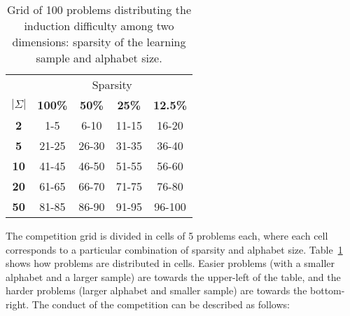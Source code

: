\begin{table}
\begin{center}
\begin{tabular}{c|c c c c}
&\multicolumn{4}{|c}{Sparsity}\\ 
\textbf{$|\Sigma|$} & \textbf{100\%} & \textbf{50\%} & \textbf{25\%} & \textbf{12.5\%}\\
\hline
\textbf{2}  & 1-5   & 6-10  & 11-15 & 16-20 \\
\textbf{5}  & 21-25 & 26-30 & 31-35 & 36-40 \\
\textbf{10} & 41-45 & 46-50 & 51-55 & 56-60 \\
\textbf{20} & 61-65 & 66-70 & 71-75 & 76-80 \\
\textbf{50} & 81-85 & 86-90 & 91-95 & 96-100\\
\end{tabular}
\end{center}
\caption{\label{stamina:table:problem-grid}Grid of 100 problems distributing the induction difficulty among two dimensions: sparsity of the learning sample and alphabet size.}
\end{table}

The competition grid is divided in cells of 5 problems each, where each cell corresponds to a particular combination of sparsity and alphabet size. Table~\ref{stamina:table:problem-grid} shows how problems are distributed in cells. Easier problems (with a smaller alphabet and a larger sample) are towards the upper-left of the table, and the harder problems (larger alphabet and smaller sample) are towards the bottom-right. The conduct of the competition can be described as follows:

